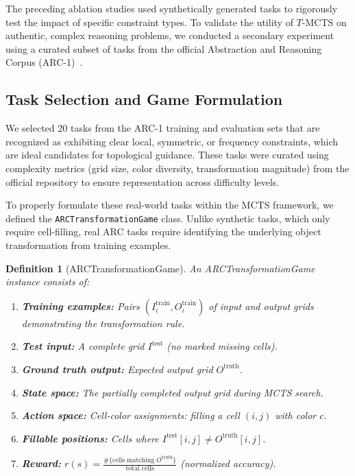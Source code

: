 \documentclass[11pt]{article}
\newtheorem{definition}{Definition}
\begin{document}
The preceding ablation studies used synthetically generated tasks to rigorously test the impact of specific constraint types. To validate the utility of $T$-MCTS on authentic, complex reasoning problems, we conducted a secondary experiment using a curated subset of tasks from the official Abstraction and Reasoning Corpus (ARC-1)~\cite{Chollet2019}.

\subsection{Task Selection and Game Formulation}

We selected 20 tasks from the ARC-1 training and evaluation sets that are recognized as exhibiting clear local, symmetric, or frequency constraints, which are ideal candidates for topological guidance. These tasks were curated using complexity metrics (grid size, color diversity, transformation magnitude) from the official repository to ensure representation across difficulty levels.

To properly formulate these real-world tasks within the MCTS framework, we defined the \texttt{ARCTransformationGame} class. Unlike synthetic tasks, which only require cell-filling, real ARC tasks require identifying the underlying object transformation from training examples.

\begin{definition}[ARCTransformationGame]
An ARCTransformationGame instance consists of:
\begin{enumerate}
\item \textbf{Training examples:} Pairs $(I_i^{\text{train}}, O_i^{\text{train}})$ of input and output grids demonstrating the transformation rule.
\item \textbf{Test input:} A complete grid $I^{\text{test}}$ (no marked missing cells).
\item \textbf{Ground truth output:} Expected output grid $O^{\text{truth}}$.
\item \textbf{State space:} The partially completed output grid during MCTS search.
\item \textbf{Action space:} Cell-color assignments: filling a cell $(i,j)$ with color $c$.
\item \textbf{Fillable positions:} Cells where $I^{\text{test}}[i,j] \neq O^{\text{truth}}[i,j]$.
\item \textbf{Reward:} $r(s) = \frac{\#\{\text{cells matching } O^{\text{truth}}\}}{\text{total cells}}$ (normalized accuracy).
\end{enumerate}
\end{definition}
\end{document}
